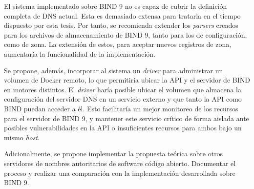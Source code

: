 \begin{recomendations}
El sistema implementado sobre BIND 9 no es capaz de cubrir la definición completa de DNS actual. Esta es demasiado extensa para tratarla en el tiempo dispuesto por esta tesis. Por tanto, se recomienda extender los \textit{parsers} creados para los archivos de almacenamiento de BIND 9, tanto para los de configuración, como de zona. La extensión de estos, para aceptar nuevos registros de zona, aumentaría la funcionalidad de la implementación.

Se propone, además, incorporar al sistema un \textit{driver} para administrar un volumen de Docker remoto, lo que permitiría ubicar la API y el servidor de BIND en motores distintos. El \textit{driver} haría posible ubicar el volumen que almacena la configuración del servidor DNS en un servicio externo y que tanto la API como BIND puedan acceder a él. Esto facilitaría un mejor monitoreo de los recursos para el servidor de BIND 9, y mantener este servicio crítico de forma aislada ante posibles vulnerabilidades en la API o insuficientes recursos para ambos bajo un mismo \textit{host}.

Adicionalmente, se propone implementar la propuesta teórica sobre otros servidores de nombres autoritarios de software código abierto. Documentar el proceso y realizar una comparación con la implementación desarrollada sobre BIND 9. 
\end{recomendations}
